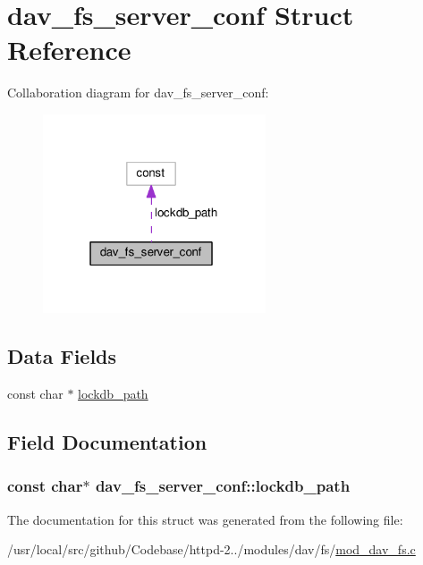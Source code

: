\hypertarget{structdav__fs__server__conf}{}\section{dav\+\_\+fs\+\_\+server\+\_\+conf Struct Reference}
\label{structdav__fs__server__conf}


Collaboration diagram for dav\+\_\+fs\+\_\+server\+\_\+conf\+:
\nopagebreak
\begin{figure}[H]
\begin{center}
\leavevmode
\includegraphics[width=187pt]{structdav__fs__server__conf__coll__graph}
\end{center}
\end{figure}
\subsection*{Data Fields}
\begin{DoxyCompactItemize}
\item 
const char $\ast$ \hyperlink{structdav__fs__server__conf_ac2c878cbdc55063fe9dd435f9c920f4c}{lockdb\+\_\+path}
\end{DoxyCompactItemize}


\subsection{Field Documentation}
\subsubsection[{\texorpdfstring{lockdb\+\_\+path}{lockdb_path}}]{\setlength{\rightskip}{0pt plus 5cm}const char$\ast$ dav\+\_\+fs\+\_\+server\+\_\+conf\+::lockdb\+\_\+path}\hypertarget{structdav__fs__server__conf_ac2c878cbdc55063fe9dd435f9c920f4c}{}\label{structdav__fs__server__conf_ac2c878cbdc55063fe9dd435f9c920f4c}


The documentation for this struct was generated from the following file\+:\begin{DoxyCompactItemize}
\item 
/usr/local/src/github/\+Codebase/httpd-\/2../modules/dav/fs/\hyperlink{mod__dav__fs_8c}{mod\+\_\+dav\+\_\+fs.\+c}\end{DoxyCompactItemize}
